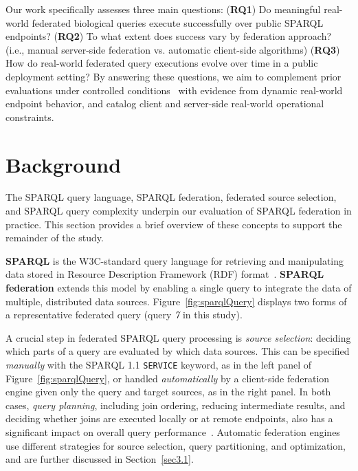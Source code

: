 \documentclass[runningheads]{llncs}
\begin{document}
Our work specifically assesses three main questions:
(\textbf{RQ1}) Do meaningful real-world federated biological queries execute successfully over public SPARQL endpoints?
(\textbf{RQ2}) To what extent does success vary by federation approach? (i.e., manual server-side federation vs. automatic client-side algorithms)
(\textbf{RQ3}) How do real-world federated query executions evolve over time in a public deployment setting?
By answering these questions, we aim to complement prior evaluations under controlled conditions~\cite{Schmidt2011FedBench,Saleem2018LargeRDFBench,Dang2023FedShop} with evidence from dynamic real-world endpoint behavior, and catalog client and server-side real-world operational constraints.


\section{Background}\label{sec2}

The SPARQL query language, SPARQL federation, federated source selection, and SPARQL query complexity underpin our evaluation of SPARQL federation in practice. 
This section provides a brief overview of these concepts to support the remainder of the study.



\textbf{SPARQL} is the W3C-standard query language for retrieving and manipulating data stored in Resource Description Framework (RDF) format~\cite{Feigenbaum2013SPARQL}. 
\textbf{SPARQL federation} extends this model by enabling a single query to integrate the data of multiple, distributed data sources.
Figure~\ref{fig:sparqlQuery} displays two forms of a representative federated query (query \textit{7} in this study).

A crucial step in federated SPARQL query processing is \textit{source selection}: deciding which parts of a query are evaluated by which data sources. 
This can be specified \textit{manually} with the SPARQL 1.1 \texttt{SERVICE} keyword, as in the left panel of Figure~\ref{fig:sparqlQuery}, or handled \textit{automatically} by a client-side federation engine given only the query and target sources, as in the right panel. 
In both cases, \textit{query planning}, including join ordering, reducing intermediate results, and deciding whether joins are executed locally or at remote endpoints, also has a significant impact on overall query performance~\cite{Schmidt2010Foundations}. 
Automatic federation engines use different strategies for source selection, query partitioning, and optimization, and are further discussed in Section~\ref{sec3.1}.
\end{document}
